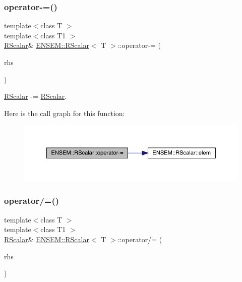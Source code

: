 \subsubsection{\texorpdfstring{operator-\/=()}{operator-=()}\hspace{0.1cm}{\footnotesize\ttfamily [2/2]}}
{\footnotesize\ttfamily template$<$class T $>$ \\
template$<$class T1 $>$ \\
\mbox{\hyperlink{classENSEM_1_1RScalar}{R\+Scalar}}\& \mbox{\hyperlink{classENSEM_1_1RScalar}{E\+N\+S\+E\+M\+::\+R\+Scalar}}$<$ T $>$\+::operator-\/= (\begin{DoxyParamCaption}\item[{const \mbox{\hyperlink{classENSEM_1_1RScalar}{R\+Scalar}}$<$ T1 $>$ \&}]{rhs }\end{DoxyParamCaption})\hspace{0.3cm}{\ttfamily [inline]}}



\mbox{\hyperlink{classENSEM_1_1RScalar}{R\+Scalar}} -\/= \mbox{\hyperlink{classENSEM_1_1RScalar}{R\+Scalar}}. 

Here is the call graph for this function\+:
\nopagebreak
\begin{figure}[H]
\begin{center}
\leavevmode
\includegraphics[width=350pt]{d0/d8c/classENSEM_1_1RScalar_a6d158db5ecf3dcc81fe905c6664cac58_cgraph}
\end{center}
\end{figure}
\mbox{\label{classENSEM_1_1RScalar_a8d8cc49d7fed142b93c987c653465000}} 
\subsubsection{\texorpdfstring{operator/=()}{operator/=()}\hspace{0.1cm}{\footnotesize\ttfamily [1/2]}}
{\footnotesize\ttfamily template$<$class T $>$ \\
template$<$class T1 $>$ \\
\mbox{\hyperlink{classENSEM_1_1RScalar}{R\+Scalar}}\& \mbox{\hyperlink{classENSEM_1_1RScalar}{E\+N\+S\+E\+M\+::\+R\+Scalar}}$<$ T $>$\+::operator/= (\begin{DoxyParamCaption}\item[{const \mbox{\hyperlink{classENSEM_1_1RScalar}{R\+Scalar}}$<$ T1 $>$ \&}]{rhs }\end{DoxyParamCaption})\hspace{0.3cm}{\ttfamily [inline]}}



